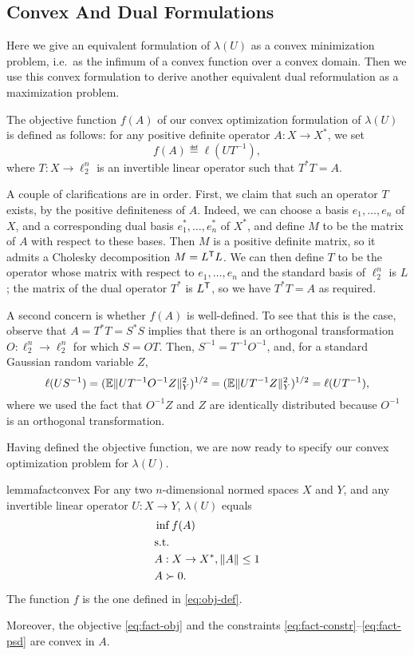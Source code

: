 \subsection{Convex And Dual Formulations}
\label{sect:fact-conv}

Here we give an equivalent formulation of $\lambda(U)$ as a convex
minimization problem, i.e.~as the infimum of a convex function over a
convex domain. Then we use this convex formulation to derive another
equivalent dual reformulation as a maximization problem.


The objective function $f(A)$ of our convex optimization formulation of
$\lambda(U)$ is defined as follows: for any positive definite
operator $A:X \to X^*$, we set
\begin{equation}
  \label{eq:obj-def}
  f(A) \eqdef \ell(UT^{-1}),
\end{equation}
where $T:X \to \ell_2^n$ is an invertible linear operator such that $T^*T = A$. 

A couple of clarifications are in order. First, we claim that such an
operator $T$ exists, by the positive definiteness of $A$. Indeed, we
can choose a basis $e_1, \ldots, e_n$ of $X$, and a corresponding dual
basis $e_1^*, \ldots, e_n^*$ of $X^*$, and define $M$ to be the matrix
of $A$ with respect to these bases. Then $M$ is a positive definite
matrix, so it admits a Cholesky decomposition $M = L^\mathsf T L$. We can
then define $T$ to be the operator whose matrix with respect to $e_1,
\ldots, e_n$ and the standard basis of $\ell_2^n$ is $L$; the matrix
of the dual operator $T^*$ is $L^\mathsf T$, so we have $T^*T = A$ as required.

A second concern is whether $f(A)$ is well-defined. To see that this
is the case, observe that $A = T^*T = S^*S$ implies that there is an
orthogonal transformation $O:\ell_2^n \to \ell_2^n$ for which $S =
OT$.  Then, $S^{-1} = T^{-1}O^{-1}$, and, for a standard Gaussian
random variable $Z$,
\[
\ell(US^{-1}) = (\mathbb{E}\|UT^{-1}O^{-1}Z\|_Y^2)^{1/2} =
(\mathbb{E}\|UT^{-1}Z\|_Y^2)^{1/2}
= \ell(UT^{-1}),
\]
where we used the fact that $O^{-1}Z$ and $Z$ are identically
distributed because $O^{-1}$ is an orthogonal transformation. 

Having defined the objective function, we are now ready to specify our
convex optimization problem for $\lambda(U)$.
\begin{restatable}{lemma}{factconvex}
  \label{lm:fact-convex}
  For any two $n$-dimensional normed spaces $X$ and $Y$, and any
  invertible linear operator $U:X \to Y$, $\lambda(U)$ equals
  \begin{align}
    &\inf  f(A)  \label{eq:fact-obj}\\
    &\text{s.t.}\notag\\
    &A: X \to X^*,\|A\| \le 1\label{eq:fact-constr}\\
    &A \succ 0.\label{eq:fact-psd}
  \end{align}
  The function $f$ is the one defined in \eqref{eq:obj-def}.

  Moreover, the objective \eqref{eq:fact-obj} and the constraints
  \eqref{eq:fact-constr}--\eqref{eq:fact-psd} are convex in $A$.
\end{restatable}

